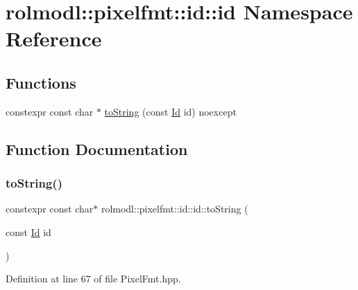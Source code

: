 \hypertarget{namespacerolmodl_1_1pixelfmt_1_1id_1_1id}{}\section{rolmodl\+::pixelfmt\+::id\+::id Namespace Reference}
\label{namespacerolmodl_1_1pixelfmt_1_1id_1_1id}
\subsection*{Functions}
\begin{DoxyCompactItemize}
\item 
constexpr const char $\ast$ \mbox{\hyperlink{namespacerolmodl_1_1pixelfmt_1_1id_1_1id_acb4933f196e5be631fd34264f51cfaf7}{to\+String}} (const \mbox{\hyperlink{namespacerolmodl_1_1pixelfmt_a96282713e4465ba9211c8fd3a702b52b}{Id}} id) noexcept
\end{DoxyCompactItemize}


\subsection{Function Documentation}
\mbox{\label{namespacerolmodl_1_1pixelfmt_1_1id_1_1id_acb4933f196e5be631fd34264f51cfaf7}} 
\subsubsection{\texorpdfstring{toString()}{toString()}}
{\footnotesize\ttfamily constexpr const char$\ast$ rolmodl\+::pixelfmt\+::id\+::id\+::to\+String (\begin{DoxyParamCaption}\item[{const \mbox{\hyperlink{namespacerolmodl_1_1pixelfmt_a96282713e4465ba9211c8fd3a702b52b}{Id}}}]{id }\end{DoxyParamCaption})\hspace{0.3cm}{\ttfamily [noexcept]}}



Definition at line 67 of file Pixel\+Fmt.\+hpp.

